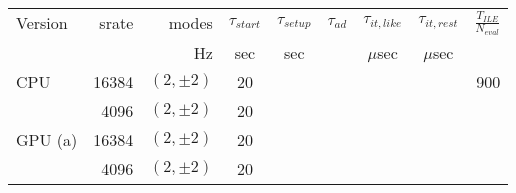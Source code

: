\documentclass[twocolumn,prd,nofootinbib]{revtex4}
\newcommand\editremark[1]{{\color{red} #1}}
\begin{document}
\begin{table}
\begin{tabular}{lrr|ccccc|r}
Version & srate & modes & $\tau_{start}$ & $\tau_{setup}$ & $\tau_{ad}$ & $\tau_{it,like}$ &$\tau_{it,rest}$ & $\frac{T_{ILE}}{N_{eval}}$\\  %
  &  & Hz & sec & sec & & $\mu$sec & $\mu$sec\\ \hline 
CPU & 16384 & $(2,\pm 2) $ & 20 & && & &  \editremark{900}  \\ 
       & 4096 & $(2,\pm 2) $ &   20 \\ \hline
GPU (a) & 16384 & $(2,\pm 2) $  & 20  & &   \\
            & 4096 &$(2,\pm 2) $  &  20 &\\

\end{tabular}
\end{table}
\end{document}
